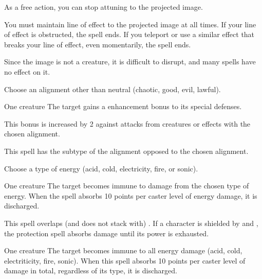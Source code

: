 As a free action, you can stop attuning to the projected image.

\spellnotes You must maintain line of effect to the projected image at all times. If your line of effect is obstructed, the spell ends. If you teleport or use a similar effect that breaks your line of effect, even momentarily, the spell ends.

Since the image is not a creature, it is difficult to disrupt, and many spells have no effect on it.

\spellrng{\rngclose}
\spelldur{\durshort \dismissable}
\spellspecial Choose an alignment other than neutral (chaotic, good, evil, lawful).
\begin{spelltarget}{One creature}
    \spelleffect The target gains a  enhancement bonus to its special defenses. \spellbonusscalingdescription

    This bonus is increased by 2 against attacks from creatures or effects with the chosen alignment.
\end{spelltarget}
\spellnotes This spell has the subtype of the alignment opposed to the chosen alignment.

\spellspecial Choose a type of energy (acid, cold, electricity, fire, or sonic).
\begin{spelltarget}{One creature}
    \spelleffect The target becomes immune to damage from the chosen type of energy. When the spell absorbs 10 points per caster level of energy damage, it is discharged.
\end{spelltarget}
\spellnotes This spell overlaps (and does not stack with) . If a character is shielded by  and , the protection spell absorbs damage until its power is exhausted.

\begin{spelltarget}{One creature}
    \spelleffect The target becomes immune to all energy damage (acid, cold, electriticity, fire, sonic). When this spell absorbs 10 points per caster level of damage in total, regardless of its type, it is discharged.
\end{spelltarget}

